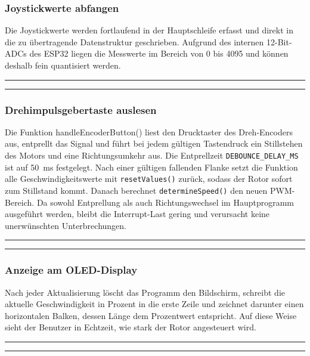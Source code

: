 \documentclass[a4paper,12pt]{article}
\begin{document}
\subsubsection{Joystickwerte abfangen}

Die Joystickwerte werden fortlaufend in der Hauptschleife erfasst und direkt in die zu übertragende Datenstruktur geschrieben. Aufgrund des internen 12-Bit-ADCs des ESP32 liegen die Messwerte im Bereich von 0 bis 4095 und können deshalb fein quantisiert werden.
\newline\noindent\rule{\linewidth}{0.4pt}  %

\noindent\rule{\linewidth}{0.4pt}  %



\subsubsection{Drehimpulsgebertaste auslesen}

Die Funktion handleEncoderButton() liest den Drucktaster des Dreh-Encoders aus, entprellt das Signal und führt bei jedem gültigen Tastendruck ein Stillstehen des Motors und eine Richtungsumkehr aus. Die Entprellzeit \texttt{DEBOUNCE\_DELAY\_MS} ist auf \SI{50}{\milli\second} festgelegt. Nach einer gültigen fallenden Flanke setzt die Funktion alle Geschwindigkeitswerte mit \texttt{resetValues()} zurück, sodass der Rotor sofort zum Stillstand kommt. Danach berechnet \texttt{determineSpeed()} den neuen PWM-Bereich. Da sowohl Entprellung als auch Richtungswechsel im Hauptprogramm ausgeführt werden, bleibt die Interrupt-Last gering und verursacht keine unerwünschten Unterbrechungen.


\noindent\rule{\linewidth}{0.4pt}  %

\noindent\rule{\linewidth}{0.4pt}  %


\subsubsection{Anzeige am OLED-Display}
Nach jeder Aktualisierung löscht das Programm den Bildschirm, schreibt die aktuelle Geschwindigkeit in Prozent in die erste Zeile und zeichnet darunter einen horizontalen Balken, dessen Länge dem Prozentwert entspricht. Auf diese Weise sieht der Benutzer in Echtzeit, wie stark der Rotor angesteuert wird. 
\newline\noindent\rule{\linewidth}{0.4pt}  %

\noindent\rule{\linewidth}{0.4pt}  %
\end{document}
